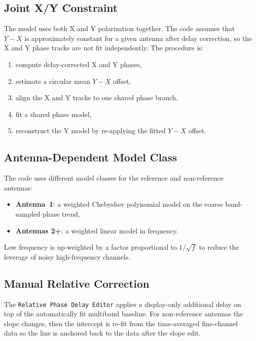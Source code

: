 \documentclass[11pt]{article}
\begin{document}
\subsection{Joint X/Y Constraint}

The model uses both X and Y polarization together. The code assumes that
$Y-X$ is approximately constant for a given antenna after delay correction, so
the X and Y phase tracks are not fit independently. The procedure is:
\begin{enumerate}[leftmargin=1.5em]
  \item compute delay-corrected X and Y phases,
  \item estimate a circular mean $Y-X$ offset,
  \item align the X and Y tracks to one shared phase branch,
  \item fit a shared phase model,
  \item reconstruct the Y model by re-applying the fitted $Y-X$ offset.
\end{enumerate}

\subsection{Antenna-Dependent Model Class}

The code uses different model classes for the reference and non-reference
antennas:
\begin{itemize}[leftmargin=1.5em]
  \item \textbf{Antenna~1}: a weighted Chebyshev polynomial model on the coarse
  band-sampled phase trend,
  \item \textbf{Antennas 2+}: a weighted linear model in frequency.
\end{itemize}

Low frequency is up-weighted by a factor proportional to $1/\sqrt{f}$ to reduce
the leverage of noisy high-frequency channels.

\subsection{Manual Relative Correction}

The \texttt{Relative Phase Delay Editor} applies a display-only additional delay
on top of the automatically fit multiband baseline. For non-reference antennas
the slope changes, then the intercept is re-fit from the time-averaged
fine-channel data so the line is anchored back to the data after the slope edit.
\end{document}
